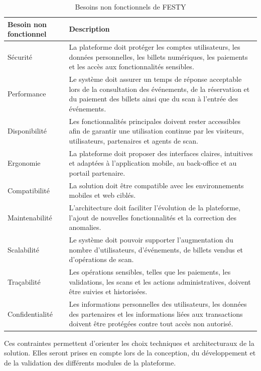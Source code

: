 \begin{table}[H]
\centering
\caption{Besoins non fonctionnels de FESTY}
\label{tableau:2-3}
\renewcommand{\arraystretch}{1.2}
\begin{tabularx}{\textwidth}{|>{\raggedright\arraybackslash}X|>{\raggedright\arraybackslash}X|}
\hline
\rowcolor[HTML]{ECF4FF}
\textbf{Besoin non fonctionnel} & \textbf{Description} \\
\hline
Sécurité & La plateforme doit protéger les comptes utilisateurs, les données personnelles, les billets numériques, les paiements et les accès aux fonctionnalités sensibles. \\
\hline
Performance & Le système doit assurer un temps de réponse acceptable lors de la consultation des événements, de la réservation et du paiement des billets ainsi que du scan à l’entrée des événements. \\
\hline
Disponibilité & Les fonctionnalités principales doivent rester accessibles afin de garantir une utilisation continue par les visiteurs, utilisateurs, partenaires et agents de scan. \\
\hline
Ergonomie & La plateforme doit proposer des interfaces claires, intuitives et adaptées à l’application mobile, au back-office et au portail partenaire. \\
\hline
Compatibilité & La solution doit être compatible avec les environnements mobiles et web ciblés. \\
\hline
Maintenabilité & L’architecture doit faciliter l’évolution de la plateforme, l’ajout de nouvelles fonctionnalités et la correction des anomalies. \\
\hline
Scalabilité & Le système doit pouvoir supporter l’augmentation du nombre d’utilisateurs, d’événements, de billets vendus et d’opérations de scan. \\
\hline
Traçabilité & Les opérations sensibles, telles que les paiements, les validations, les scans et les actions administratives, doivent être suivies et historisées. \\
\hline
Confidentialité & Les informations personnelles des utilisateurs, les données des partenaires et les informations liées aux transactions doivent être protégées contre tout accès non autorisé. \\
\hline
\end{tabularx}
\end{table}


Ces contraintes permettent d’orienter les choix techniques et architecturaux de la solution. Elles seront prises en compte lors de la conception, du développement et de la validation des différents modules de la plateforme.


